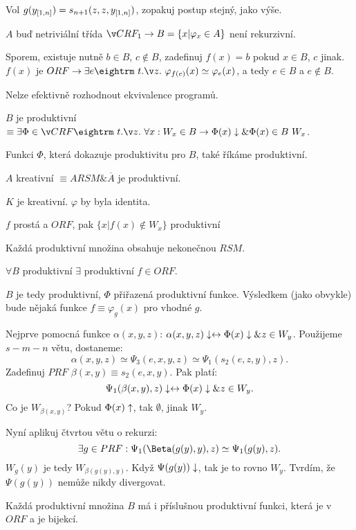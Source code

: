 \prf{} Vol $g(y_{[1,n]} ) = s_{n+1}(z,z,y_{[1,n]} )$, zopakuj postup stejný, jako výše.

 $A$ buď netriviální třída $ČRF_1 \then B = \{x | \varphi_x \in A\}$ není rekurzivní.

\prf{} Sporem, existuje nutně $b \in B$, $c \not \in B$, zadefinuj $f(x) = b$ pokud $x \in B$, $c$ jinak.
$f(x)$ je $ORF \then \exists e \st \varphi_{f(e)}(x) \simeq \varphi_e(x)$, a tedy $e \in B$ a $e \not \in B$.

\res{} Nelze efektivně rozhodnout ekvivalence programů.


\dfn $B$ je produktivní $\equiv \exists \Phi \in ČRF \st \forall x: W_x \in B \then \Phi(x) \da \& \Phi(x) \in B \ W_x$.

\dfn Funkci $\Phi$, která dokazuje produktivitu pro $B$, také říkáme produktivní.

\dfn $A$ kreativní $\equiv A RSM \& \overline{A}$ je produktivní.

\obs{} $K$ je kreativní. $\varphi$ by byla identita.

\obs{} $f$ prostá a $ORF$, pak $\{x | f(x) \not \in W_x\}$ produktivní

\obs{} Každá produktivní množina obsahuje nekonečnou $RSM$. 

 $\forall B$ produktivní $\exists$ produktivní $f \in ORF$.

\prf{}
$B$ je tedy produktivní, $\Phi$ přiřazená produktivní funkce. Výsledkem (jako obvykle) bude
nějaká funkce $f \equiv \varphi_g(x)$ pro vhodné $g$.

Nejprve pomocná funkce $\alpha(x,y,z)$: $\alpha(x,y,z)\downarrow \leftrightarrow \Phi(x)\downarrow \& z \in W_y$.
Použijeme $s-m-n$ větu, dostaneme:
$$ \alpha(x,y,z) \simeq \Psi_3(e,x,y,z) \simeq \Psi_1(s_2(e,z,y),z).$$
Zadefinuj $PRF$ $\beta(x,y) \equiv s_2(e,x,y)$. Pak platí:
$$ \Psi_1(\beta(x,y),z) \downarrow \leftrightarrow \Phi(x)\downarrow \& z \in W_y. $$
Co je $W_{\beta(x,y)}$? Pokud $\Phi(x) \uparrow$, tak $\emptyset$, jinak $W_y$.

Nyní aplikuj čtvrtou větu o rekurzi:
$$ \exists g \in PRF: \Psi_1(\Beta(g(y),y),z) \simeq \Psi_1(g(y),z). $$
$W_g(y)$ je tedy $W_{\beta(g(y),y)}$. Když $\Psi(g(y)) \downarrow$, tak je to rovno $W_y$. 
Tvrdím, že $\Psi(g(y))$ nemůže nikdy divergovat.
 
Každá produktivní množina $B$ má i příslušnou produktivní funkci, která je v $ORF$ a je bijekcí.

